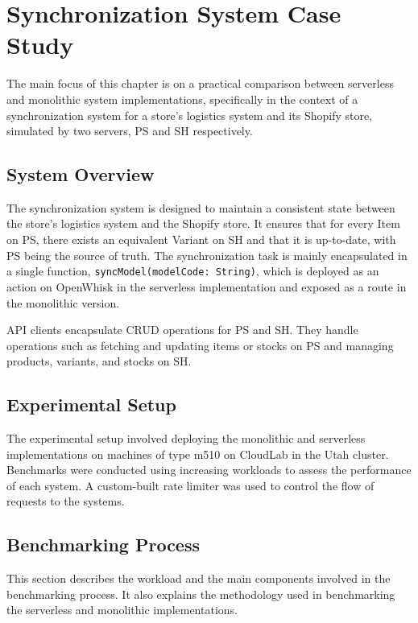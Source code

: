 \chapter{Synchronization System Case Study}
\label{chap:synchronization}

The main focus of this chapter is on a practical comparison between serverless and monolithic system implementations, specifically in the context of a synchronization system for a store's logistics system and its Shopify store, simulated by two servers, PS and SH respectively.

\section{System Overview}

The synchronization system is designed to maintain a consistent state between the store's logistics system and the Shopify store. It ensures that for every Item on PS, there exists an equivalent Variant on SH and that it is up-to-date, with PS being the source of truth. The synchronization task is mainly encapsulated in a single function, \texttt{syncModel(modelCode: String)}, which is deployed as an action on OpenWhisk in the serverless implementation and exposed as a route in the monolithic version.

API clients encapsulate CRUD operations for PS and SH. They handle operations such as fetching and updating items or stocks on PS and managing products, variants, and stocks on SH. 

\section{Experimental Setup}

The experimental setup involved deploying the monolithic and serverless implementations on machines of type m510 on CloudLab in the Utah cluster. Benchmarks were conducted using increasing workloads to assess the performance of each system. A custom-built rate limiter was used to control the flow of requests to the systems.

\section{Benchmarking Process}

This section describes the workload and the main components involved in the benchmarking process. It also explains the methodology used in benchmarking the serverless and monolithic implementations.

